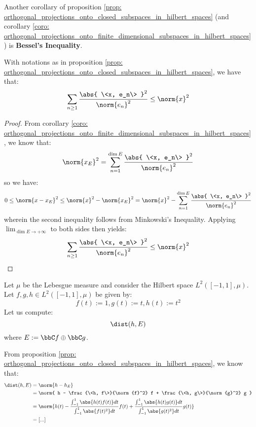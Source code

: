         Another corollary of proposition \ref{prop: orthogonal_projections_onto_closed_subspaces_in_hilbert_spaces} (and corollary \ref{coro: orthogonal_projections_onto_finite_dimensional_subspaces_in_hilbert_spaces}) is \textbf{Bessel's Inequality}.
        \begin{corollary} \label{coro: bessel_inequality}
            With notations as in proposition \ref{prop: orthogonal_projections_onto_closed_subspaces_in_hilbert_spaces}, we have that:
                $$\sum_{n \geq 1} \frac{ \abs{ \<x, e_n\> }^2 }{\norm{e_n}^2} \leq \norm{x}^2$$
        \end{corollary}
            \begin{proof}
                From corollary \ref{coro: orthogonal_projections_onto_finite_dimensional_subspaces_in_hilbert_spaces}, we know that:
                    $$\norm{x_E}^2 = \sum_{n = 1}^{\dim E} \frac{ \abs{ \<x, e_n\> }^2 }{\norm{e_n}^2}$$
                so we have:
                    $$0 \leq \norm{x - x_E}^2 \leq \norm{x}^2 - \norm{x_E}^2 = \norm{x}^2 - \sum_{n = 1}^{\dim E} \frac{ \abs{ \<x, e_n\> }^2 }{\norm{e_n}^2}$$
                wherein the second inequality follows from Minkowski's Inequality. Applying $\lim_{\dim E \to +\infty}$ to both sides then yields:
                    $$\sum_{n \geq 1} \frac{ \abs{ \<x, e_n\> }^2 }{\norm{e_n}^2} \leq \norm{x}^2$$
            \end{proof}
            
        \begin{example}
            Let $\mu$ be the Lebesgue measure and consider the Hilbert space $L^2([-1, 1], \mu)$. Let $f, g, h \in L^2([-1, 1], \mu)$ be given by:
                $$f(t) := 1, g(t) := t, h(t) := t^2$$
            Let us compute:
                $$\dist( h, E )$$
            where $E := \bbC f \oplus \bbC g$.

            From proposition \ref{prop: orthogonal_projections_onto_closed_subspaces_in_hilbert_spaces}, we know that:
                $$
                    \begin{aligned}
                        \dist(h, E) & = \norm{h - h_E}
                        \\
                        & = \norm{ h - \frac{\<h, f\>}{\norm{f}^2} f + \frac{\<h, g\>}{\norm{g}^2} g }
                        \\
                        & = \norm{ h(t) - \frac{\int_{-1}^1 \abs{h(t) f(t)} dt}{\int_{-1}^1 \abs{f(t)^2} dt} f(t) + \frac{\int_{-1}^1 \abs{h(t) g(t)} dt}{\int_{-1}^1 \abs{g(t)^2} dt} g(t) }
                        \\
                        & = [...]
                    \end{aligned}
                $$
        \end{example}

